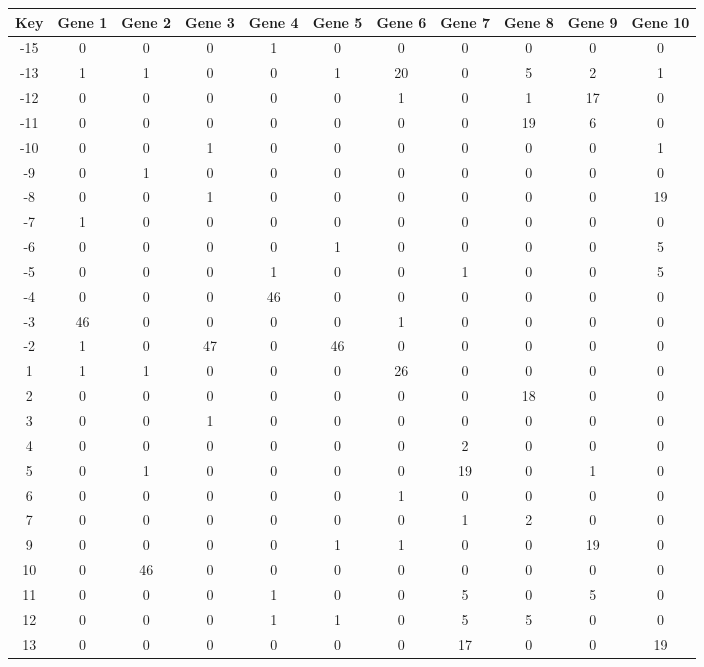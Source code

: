 \begin{tabular}{|c|c|c|c|c|c|c|c|c|c|c|}
\hline
Key & Gene 1 & Gene 2 & Gene 3 & Gene 4 & Gene 5 & Gene 6 & Gene 7 & Gene 8 & Gene 9 & Gene 10 \\
\hline
-15 & 0 & 0 & 0 & 1 & 0 & 0 & 0 & 0 & 0 & 0 \\
-13 & 1 & 1 & 0 & 0 & 1 & 20 & 0 & 5 & 2 & 1 \\
-12 & 0 & 0 & 0 & 0 & 0 & 1 & 0 & 1 & 17 & 0 \\
-11 & 0 & 0 & 0 & 0 & 0 & 0 & 0 & 19 & 6 & 0 \\
-10 & 0 & 0 & 1 & 0 & 0 & 0 & 0 & 0 & 0 & 1 \\
-9 & 0 & 1 & 0 & 0 & 0 & 0 & 0 & 0 & 0 & 0 \\
-8 & 0 & 0 & 1 & 0 & 0 & 0 & 0 & 0 & 0 & 19 \\
-7 & 1 & 0 & 0 & 0 & 0 & 0 & 0 & 0 & 0 & 0 \\
-6 & 0 & 0 & 0 & 0 & 1 & 0 & 0 & 0 & 0 & 5 \\
-5 & 0 & 0 & 0 & 1 & 0 & 0 & 1 & 0 & 0 & 5 \\
-4 & 0 & 0 & 0 & 46 & 0 & 0 & 0 & 0 & 0 & 0 \\
-3 & 46 & 0 & 0 & 0 & 0 & 1 & 0 & 0 & 0 & 0 \\
-2 & 1 & 0 & 47 & 0 & 46 & 0 & 0 & 0 & 0 & 0 \\
1 & 1 & 1 & 0 & 0 & 0 & 26 & 0 & 0 & 0 & 0 \\
2 & 0 & 0 & 0 & 0 & 0 & 0 & 0 & 18 & 0 & 0 \\
3 & 0 & 0 & 1 & 0 & 0 & 0 & 0 & 0 & 0 & 0 \\
4 & 0 & 0 & 0 & 0 & 0 & 0 & 2 & 0 & 0 & 0 \\
5 & 0 & 1 & 0 & 0 & 0 & 0 & 19 & 0 & 1 & 0 \\
6 & 0 & 0 & 0 & 0 & 0 & 1 & 0 & 0 & 0 & 0 \\
7 & 0 & 0 & 0 & 0 & 0 & 0 & 1 & 2 & 0 & 0 \\
9 & 0 & 0 & 0 & 0 & 1 & 1 & 0 & 0 & 19 & 0 \\
10 & 0 & 46 & 0 & 0 & 0 & 0 & 0 & 0 & 0 & 0 \\
11 & 0 & 0 & 0 & 1 & 0 & 0 & 5 & 0 & 5 & 0 \\
12 & 0 & 0 & 0 & 1 & 1 & 0 & 5 & 5 & 0 & 0 \\
13 & 0 & 0 & 0 & 0 & 0 & 0 & 17 & 0 & 0 & 19 \\
\hline
\end{tabular}